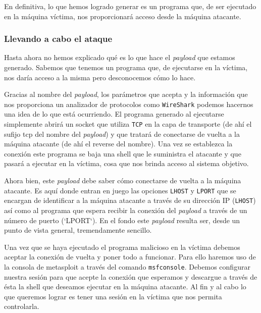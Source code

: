 \documentclass[12pt]{article}
\newcommand{\newpar} {
    \vskip 1cm
}
\begin{document}
                \newpar

                En definitiva, lo que hemos logrado generar es un programa que, de ser ejecutado en la máquina víctima, nos proporcionará acceso desde la máquina atacante.

            \subsubsection{Llevando a cabo el ataque}
                Hasta ahora no hemos explicado qué es lo que hace el \textit{payload} que estamos generado. Sabemos que tenemos un programa que, de ejecutarse en la víctima, nos daría acceso a la misma pero desconocemos cómo lo hace.

                \newpar

                Gracias al nombre del \textit{payload}, los parámetros que acepta y la información que nos proporciona un analizador de protocolos como \texttt{WireShark} podemos hacernos una idea de lo que está ocurriendo. El programa generado al ejecutarse simplemente abrirá un socket que utiliza \texttt{TCP} en la capa de transporte (de ahí el sufijo tcp del nombre del \textit{payload}) y que tratará de conectarse de vuelta a la máquina atacante (de ahí el reverse del nombre). Una vez se establezca la conexión este programa se baja una shell que le suministra el atacante y que pasará a ejecutar en la víctima, cosa que nos brinda acceso al sistema objetivo.

                \newpar

                Ahora bien, este \textit{payload} debe saber cómo conectarse de vuelta a la máquina atacante. Es aquí donde entran en juego las opciones \texttt{LHOST} y \texttt{LPORT} que se encargan de identificar a la máquina atacante a través de su dirección IP (\texttt{LHOST}) así como al programa que espera recibir la conexión del \textit{payload} a través de un número de puerto (`LPORT`). En el fondo este \textit{payload} resulta ser, desde un punto de vista general, tremendamente sencillo.

                \newpar

                Una vez que se haya ejecutado el programa malicioso en la víctima debemos aceptar la conexión de vuelta y poner todo a funcionar. Para ello haremos uso de la consola de metasploit a través del comando \texttt{msfconsole}. Debemos configurar nuestra sesión para que acepte la conexión que esperamos y descargue a través de ésta la shell que deseamos ejecutar en la máquina atacante. Al fin y al cabo lo que queremos lograr es tener una sesión en la víctima que nos permita controlarla.
\end{document}
